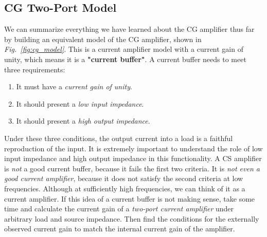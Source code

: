 \subsection{CG Two-Port Model}
We can summarize everything we have learned about the CG amplifier thus far by building an equivalent model of the CG amplifier, shown in \emph{Fig.~\ref{fig:cg_model}}.  This is a current amplifier model with a current gain of unity, which means it is a \textbf{"current buffer"}.  A current buffer needs to meet three requirements:
\vspace{0.25cm}
    \begin{enumerate}
        \setlength\itemsep{0.15cm}
        \item{It must have a \textit{current gain of unity}.}
        \item{It should present a \textit{low input impedance}.}
        \item{It should present a \textit{high output impedance}.}
    \end{enumerate}
\vspace{0.25cm}
Under these three conditions, the output current into a load is a faithful reproduction of the input.  It is extremely important to understand the role of low input impedance and high output impedance in this functionality.  A CS amplifier is \textit{not} a good current buffer, because it fails the first two criteria.  It is \textit{not even a good current amplifier}, because it does not satisfy the second criteria at low frequencies.  Although at sufficiently high frequencies, we can think of it as a current amplifier.  If this idea of a current buffer is not making sense, take some time and calculate the current gain of a \textit{two-port current amplifier} under arbitrary load and source impedance.  Then find the conditions for the externally observed current gain to match the internal current gain of the amplifier.
\newpage
